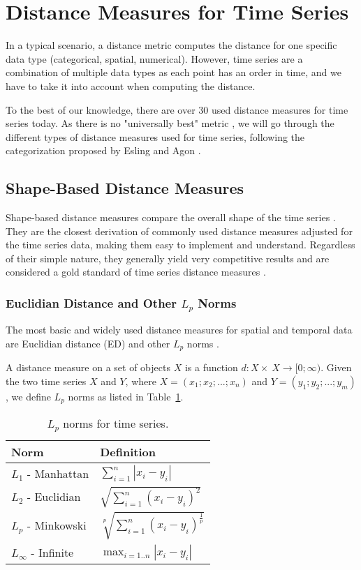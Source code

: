 \section{Distance Measures for Time Series}
In a typical scenario, a distance metric computes the distance for one specific data type (categorical, spatial, numerical). However, time series are a combination of multiple data types as each point has an order in time, and we have to take it into account when computing the distance.

To the best of our knowledge, there are over 30 used distance measures for time series today. As there is no "universally best" metric \cite{met:universal}, we will go through the different types of distance measures used for time series, following the categorization proposed by Esling and Agon \cite{met:classification}.

\subsection{Shape-Based Distance Measures}
Shape-based distance measures compare the overall shape of the time series \cite{met:classification}. They are the closest derivation of commonly used distance measures adjusted for the time series data, making them easy to implement and understand. Regardless of their simple nature, they generally yield very competitive results and are considered a gold standard of time series distance measures \cite{met:comparison-new, met:dtw-best-0, met:dtw-best-1, met:universal, met:fDTW}.

\subsubsection{Euclidian Distance and Other $L_p$ Norms}
The most basic and widely used distance measures for spatial and temporal data are Euclidian distance (ED) and other $L_p$ norms \cite{met:lp-norm, met:lp-norm-usage}.

A distance measure on a set of objects $X$ is a function $d:X\times~X\rightarrow[0; \infty)$.
Given the two time series $X$ and $Y$, where $X=(x_1; x_2; ...; x_n)$ and $Y=(y_1; y_2;...; y_m)$, we define $L_p$ norms as listed in Table~\ref{tab:lp-norms}.
\begin{table}[!htbp]
\begin{tabular}{ll}
\textbf{Norm}          & \textbf{Definition}                               \\ \hline
$L_1$ - Manhattan      & $\sum^{n}_{i=1}|x_i - y_i|$                       \\
$L_2$ - Euclidian      & $\sqrt{\sum^{n}_{i=1}(x_i - y_i)^2}$              \\
$L_p$ - Minkowski      & $\sqrt[p]{\sum^{n}_{i=1}(x_i - y_i)^\frac{1}{p}}$ \\
$L_\infty$ - Infinite  & $\max_{i=1..n}|x_i - y_i|$
\end{tabular}
\caption{$L_p$ norms for time series.}
\label{tab:lp-norms}
\end{table}

